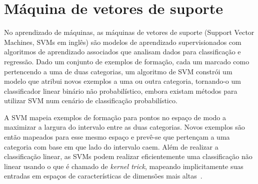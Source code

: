 \section{Máquina de vetores de suporte}
\label{sec:fun:lsvc}

No aprendizado de máquinas, as máquinas de vetores de suporte (Support Vector Machines, SVMs em inglês) são modelos de aprendizado supervisionados com algoritmos de aprendizado associados que analisam dados para classificação e regressão.
Dado um conjunto de exemplos de formação, cada um marcado como pertencendo a uma de duas categorias, um algoritmo de SVM constrói um modelo que atribui novos exemplos a uma ou outra categoria, tornando-o um classificador linear binário não probabilístico, embora existam métodos para utilizar SVM num cenário de classificação probabilístico.

A SVM mapeia exemplos de formação para pontos no espaço de modo a maximizar a largura do intervalo entre as duas categorias.
Novos exemplos são então mapeados para esse mesmo espaço e prevê-se que pertençam a uma categoria com base em que lado do intervalo caem.
Além de realizar a classificação linear, as SVMs podem realizar eficientemente uma classificação não linear usando o que é chamado de \textit{kernel trick}, mapeando implicitamente suas entradas em espaços de características de dimensões mais altas~\cite{svms}.
